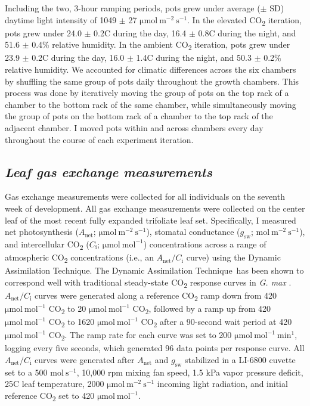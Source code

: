 Including the two, 3-hour ramping periods, pots grew under average ($\pm$ SD) daytime light intensity of 1049 $\pm$ 27 $\mathrm{\mu mol\ m^{-2}\ s^{-1}}$. In the elevated CO\textsubscript{2} iteration, pots grew under 24.0 $\pm$ 0.2\textdegree{}C during the day, 16.4 $\pm$ 0.8\textdegree{}C during the night, and 51.6 $\pm$ 0.4\% relative humidity. In the ambient CO\textsubscript{2} iteration, pots grew under 23.9 $\pm$ 0.2\textdegree{}C during the day, 16.0 $\pm$ 1.4\textdegree{}C during the night, and 50.3 $\pm$ 0.2\% relative humidity. We accounted for climatic differences across the six chambers by shuffling the same group of pots daily throughout the growth chambers. This process was done by iteratively moving the group of pots on the top rack of a chamber to the bottom rack of the same chamber, while simultaneously moving the group of pots on the bottom rack of a chamber to the top rack of the adjacent chamber. I moved pots within and across chambers every day throughout the course of each experiment iteration.

\subsection{\textit{Leaf gas exchange measurements}}
Gas exchange measurements were collected for all individuals on the seventh week of development. All gas exchange measurements were collected on the center leaf of the most recent fully expanded trifoliate leaf set. Specifically, I measured net photosynthesis ($A_\mathrm{{net}}$; $\mathrm{\mu mol\ m^{-2}\ s^{-1}}$), stomatal conductance ($g_\mathrm{{sw}}$; $\mathrm{mol\ m^{-2}\ s^{-1}}$), and intercellular CO\textsubscript{2} ($C_\mathrm{{i}}$; $\mathrm{\mu mol\ mol^{-1}}$) concentrations across a range of atmospheric CO\textsubscript{2} concentrations (i.e., an $A_\mathrm{{net}}/C_\mathrm{i}$ curve) using the Dynamic Assimilation Technique\texttrademark. The Dynamic Assimilation Technique\texttrademark\ has been shown to correspond well with traditional steady-state CO\textsubscript{2} response curves in \textit{G. max} . $A_\mathrm{{net}}/C_\mathrm{i}$ curves were generated along a reference CO\textsubscript{2} ramp down from 420 $\mathrm{\mu mol\ mol^{-1}}$ CO\textsubscript{2} to 20 $\mathrm{\mu mol\ mol^{-1}}$ CO\textsubscript{2}, followed by a ramp up from 420 $\mathrm{\mu mol\ mol^{-1}}$ CO\textsubscript{2} to 1620 $\mathrm{\mu mol\ mol^{-1}}$ CO\textsubscript{2} after a 90-second wait period at 420 $\mathrm{\mu mol\ mol^{-1}}$ CO\textsubscript{2}. The ramp rate for each curve was set to 200 $\mathrm{\mu mol\ mol^{-1}\ min^{1}}$, logging every five seconds, which generated 96 data points per response curve. All $A_\mathrm{{net}}/C_\mathrm{i}$ curves were generated after $A_\mathrm{{net}}$ and $g_\mathrm{{sw}}$ stabilized in a LI-6800 cuvette set to a 500 $\mathrm{mol\ s^{-1}}$, 10,000 rpm mixing fan speed, 1.5 kPa vapor pressure deficit, 25\textdegree{}C leaf temperature, 2000 $\mathrm{\mu mol\ m^{-2}\ s^{-1}}$ incoming light radiation, and initial reference CO\textsubscript{2} set to 420 $\mathrm{\mu mol\ mol^{-1}}$.

